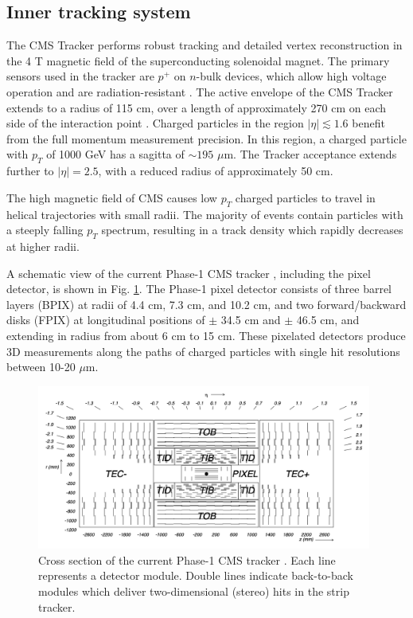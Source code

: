 \subsection{Inner tracking system}

The CMS Tracker performs robust tracking and detailed vertex reconstruction in the 4 T magnetic field of the superconducting solenoidal magnet. The primary sensors used in the tracker are $p^+$ on $n$-bulk devices, which allow high voltage operation and are radiation-resistant \cite{CERN-LHCC-98-006} \cite{CERN-LHCC-2017-009-tracker-phase2-tdr}. The active envelope of the CMS Tracker extends to a radius of 115 cm, over a length of approximately 270 cm on each side of the interaction point \cite{CERN-LHCC-98-006}.
Charged particles in the region $|\eta| \lesssim 1.6$ benefit from the full momentum measurement precision. In this region, a charged particle with $p_T$ of 1000 GeV has a sagitta of $\sim 195$ $\mu$m. The Tracker acceptance extends further to $|\eta| = 2.5$, with a reduced radius of approximately 50 cm.

The high magnetic field of CMS causes low $p_{T}$ charged particles to travel in helical trajectories with small radii. The majority of events contain particles with a steeply falling $p_{T}$ spectrum, resulting in a track density which rapidly decreases at higher radii. 

A schematic view of the current Phase-1 CMS tracker \cite{CMS-TDR-011-pixel}, including the pixel detector, is shown in Fig. \ref{fig:phase-1-tdr-tracker-schematic}. The Phase-1 pixel detector consists of three barrel layers (BPIX) at radii of 4.4 cm, 7.3 cm, and 10.2 cm, and two forward/backward disks (FPIX) at longitudinal positions of $\pm$ 34.5 cm and $\pm$ 46.5 cm, and extending in radius from about 6 cm to 15 cm. These pixelated detectors produce 3D measurements along the paths of charged particles with single hit resolutions between 10-20 $\mu$m. 


\begin{figure}[ht]
    \centering
    \includegraphics[width=11cm]{figures/ch-2-cern-cms/phase-1-tdr-tracker-schematic.png}
    \caption[Cross section of the current Phase-1 CMS tracker.]{Cross section of the current Phase-1 CMS tracker \cite{CMS-TDR-011-pixel}. Each line represents a detector module. Double lines indicate back-to-back modules which deliver two-dimensional (stereo) hits in the strip tracker.}
    \label{fig:phase-1-tdr-tracker-schematic}
\end{figure}

